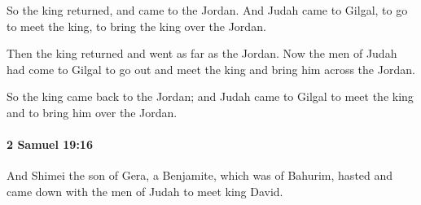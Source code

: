 			\begin{versebox}
					\item[BHS] 
					\item[ASV] So the king returned, and came to the Jordan. And Judah came to Gilgal, to go to meet the king, to bring the king over the Jordan.
					\item[NIV] Then the king returned and went as far as the Jordan. Now the men of Judah had come to Gilgal to go out and meet the king and bring him across the Jordan.
					\item[NRSV] So the king came back to the Jordan; and Judah came to Gilgal to meet the king and to bring him over the Jordan.
			\end{versebox}

		\paragraph{2 Samuel 19:16} %
			\label{2SAMUEL-19-16}

			And Shimei the son of Gera, a Benjamite, which was of Bahurim, hasted and came down with the men of Judah to meet king David.

